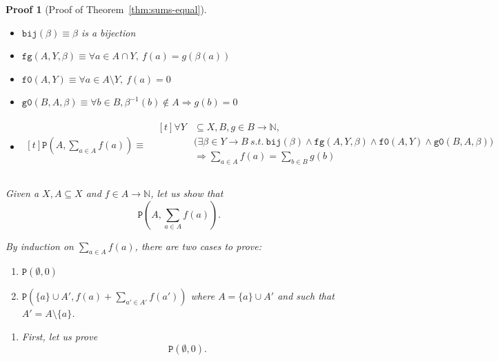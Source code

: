 \documentclass[pdflatex,sn-mathphys]{sn-jnl}%
\theoremstyle{thmstyleone}%
\theoremstyle{thmstyletwo}%
\newtheorem*{pf}{Proof}%
\theoremstyle{thmstylethree}%
\begin{document}
\begin{appendices}
\begin{pf}[Proof of Theorem~\ref{thm:sums-equal}]
  \begin{itemize}
  \item $\mathtt{bij}(\beta)\equiv\beta$ is a bijection
  \item
    $\mathtt{fg}(A,Y,\beta)\equiv\forall{}a\in{}A\cap{}Y,~f(a)=g(\beta(a))$
  \item $\mathtt{f0}(A,Y)\equiv\forall{}a\in{}A\setminus{}Y,~f(a)=0$
  \item
    $\mathtt{g0}(B,A,\beta)\equiv\forall{}b\in{}B,\beta^{-1}(b)\notin{}A\Rightarrow{}g(b)=0$
  \item $\begin{aligned}[t]
           \mathtt{P}(A,\sum\limits_{a\in{}A}f(a))\equiv{}& \begin{aligned}[t]
                                                              \forall{}Y&\subseteq{}X,B,g\in{}B\rightarrow{}\mathbb{N}, \\
                                                                        & \big(\exists{}\beta\in{}Y\rightarrow{}B~s.t.~\mathtt{bij}(\beta)\land\mathtt{fg}(A,Y,\beta)\land\mathtt{f0}(A,Y)\land\mathtt{g0}(B,A,\beta)\big) \\
                                                                        & \Rightarrow{}\sum\limits_{a\in{}A}f(a)=\sum\limits_{b\in{}B}g(b)\\
                                                            \end{aligned} \\
         \end{aligned}$
       \end{itemize}

       Given a $X, A\subseteq{}X$ and $f\in{}A\rightarrow{}\mathbb{N}$,
       let us show that
       \begin{equation*}
         \boxed{\mathtt{P}(A,\sum\limits_{a\in{}A}f(a)).}
       \end{equation*}

       By induction on $\sum\limits_{a\in{}A}f(a)$, there are two cases
       to prove:
       \begin{enumerate}
       \item $\boxed{\mathtt{P}(\emptyset,0)}$
       \item
         $\boxed{\mathtt{P}(\{a\}\cup{}A',f(a)+\sum_{a'\in{}A'}f(a'))}$
         where $A=\{a\}\cup{}A'$ and such that $A'=A\setminus{}\{a\}$.
       \end{enumerate}

       \begin{enumerate}
       \item First, let us prove
         \begin{equation*}
           \boxed{\mathtt{P}(\emptyset,0).}
         \end{equation*}


\end{enumerate}
\end{pf}
\end{appendices}
\end{document}
